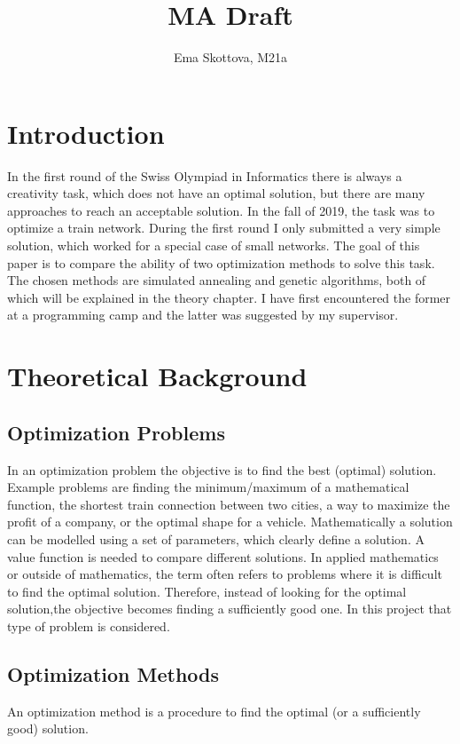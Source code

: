 \documentclass[10pt]{report}
\title{MA Draft}
\author{Ema Skottova, M21a}
\begin{document}
\maketitle

\tableofcontents

\chapter{Introduction}
In the first round of the Swiss Olympiad in Informatics there is always a creativity task, which does not have an optimal solution, but there are many approaches to reach an acceptable solution. In the fall of 2019, the task was to optimize a train network. During the first round I only submitted a very simple solution, which worked for a special case of small networks. The goal of this paper is to compare the ability of two optimization methods to solve this task. The chosen methods are simulated annealing and genetic algorithms, both of which will be explained in the theory chapter. I have first encountered the former at a programming camp and the latter was suggested by my supervisor.


\chapter{Theoretical Background}

\section{Optimization Problems}
In an optimization problem the objective is to find the best (optimal) solution. Example problems are finding the minimum/maximum of a mathematical function, the shortest train connection between two cities, a way to maximize the profit of a company, or the optimal shape for a vehicle. Mathematically a solution can be modelled using a set of parameters, which clearly define a solution. A value function is needed to compare different solutions. In applied mathematics or outside of mathematics, the term often refers to problems where it is difficult to find the optimal solution. Therefore, instead of looking for the optimal solution,the objective becomes finding a sufficiently good one. In this project that type of problem is considered.

\section{Optimization Methods}
An optimization method is a procedure to find the optimal (or a sufficiently good) solution.
\end{document}
